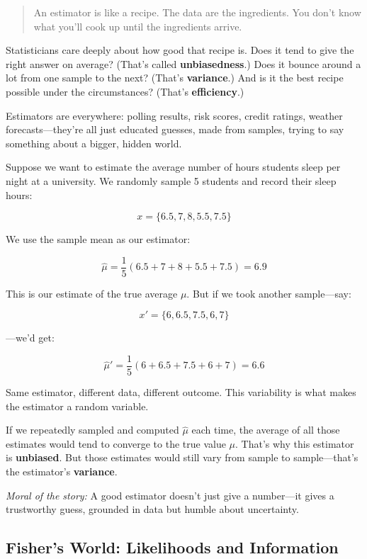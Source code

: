 \begin{quote}
An estimator is like a recipe. The data are the ingredients. You don’t know what you’ll cook up until the ingredients arrive.
\end{quote}

Statisticians care deeply about how good that recipe is. Does it tend to give the right answer on average? (That’s called \textbf{unbiasedness}.) Does it bounce around a lot from one sample to the next? (That’s \textbf{variance}.) And is it the best recipe possible under the circumstances? (That’s \textbf{efficiency}.)

Estimators are everywhere: polling results, risk scores, credit ratings, weather forecasts—they’re all just educated guesses, made from samples, trying to say something about a bigger, hidden world.

\begin{example}
Suppose we want to estimate the average number of hours students sleep per night at a university. We randomly sample 5 students and record their sleep hours:

\[
x = \{6.5, 7, 8, 5.5, 7.5\}
\]

We use the sample mean as our estimator:

\[
\hat{\mu} = \frac{1}{5}(6.5 + 7 + 8 + 5.5 + 7.5) = 6.9
\]

This is our estimate of the true average \( \mu \). But if we took another sample—say:

\[
x' = \{6, 6.5, 7.5, 6, 7\}
\]

—we’d get:

\[
\hat{\mu}' = \frac{1}{5}(6 + 6.5 + 7.5 + 6 + 7) = 6.6
\]

Same estimator, different data, different outcome. This variability is what makes the estimator a random variable.

If we repeatedly sampled and computed \( \hat{\mu} \) each time, the average of all those estimates would tend to converge to the true value \( \mu \). That’s why this estimator is \textbf{unbiased}. But those estimates would still vary from sample to sample—that’s the estimator’s \textbf{variance}.

\textit{Moral of the story:} A good estimator doesn’t just give a number—it gives a trustworthy guess, grounded in data but humble about uncertainty.
\end{example}






\subsection{Fisher’s World: Likelihoods and Information}

